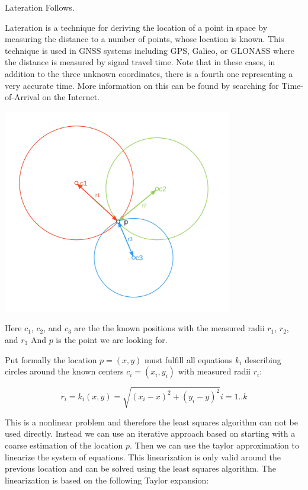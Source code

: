 \begin{task}{Lateration\up{+}}{}{}
Follows.
\end{task}
Lateration is a technique for deriving the location of a point in space
by measuring the distance to a number of points, whose location is
known. This technique is used in GNSS systems including GPS, Galieo, or GLONASS
where the distance is measured by signal travel time. Note that in these cases,
in addition to the three unknown coordinates, there is a fourth one representing a
very accurate time. More information on this can be found by searching for Time-of-Arrival
on the Internet.

\begin{center}
  \includegraphics[width=10cm]{gfx/2021_09_laterationsetup.png}
\end{center}
Here \(c_1\), \(c_2\), and \(c_3\) are the the known positions with the
measured radii \(r_1\), \(r_2\), and \(r_3\) And \(p\) is the point we
are looking for.

Put formally the location \(p = (x,y)\) must fulfill all equations
\(k_i\) describing circles around the known centers \(c_i = (x_i, y_i)\)
with measured radii \(r_i\):

\[r_i = k_i(x,y) = \sqrt{(x_i-x)^2 + (y_i-y)^2} i = 1..k\]

This is a
nonlinear problem and therefore the least squares algorithm can not be
used directly. Instead we can use an iterative approach based on
starting with a coarse estimation of the location \(p\). Then we can use
the taylor approximation to linearize the system of equations. This
linearization is only valid around the previous location and can be
solved using the least squares algorithm. The linearization is based on
the following Taylor expansion:

